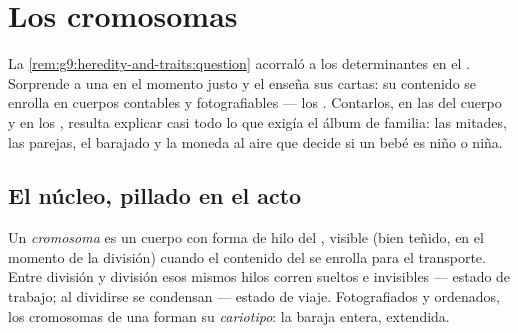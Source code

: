 \chapter{Los cromosomas}\label{ch:g9:chromosomes}

La \cref{rem:g9:heredity-and-traits:question} acorraló a los
determinantes en el . Sorprende a una  en el momento justo
y el  enseña sus cartas: su contenido se enrolla en cuerpos
contables y fotografiables --- los . Contarlos, en las
 del cuerpo y en los , resulta explicar casi todo lo que
exigía el álbum de familia: las mitades, las parejas, el barajado y la
moneda al aire que decide si un bebé es niño o niña.

\section{El núcleo, pillado en el acto}

\begin{definition}\label{def:g9:chromosomes:chromosomes}
Un \emph{cromosoma} es un cuerpo con forma de hilo del
, visible (bien teñido, en el momento de la división) cuando el
contenido del  se enrolla para el transporte. Entre división y
división esos mismos hilos corren sueltos e invisibles --- estado de
trabajo; al dividirse se condensan --- estado de viaje. Fotografiados y
ordenados, los cromosomas de una  forman su
\emph{cariotipo}: la baraja entera, extendida.
\end{definition}

